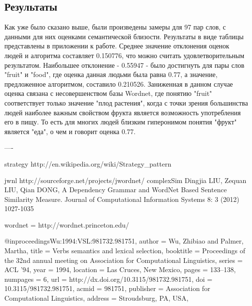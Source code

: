 \subsection{Результаты}
Как уже было сказано выше, были произведены замеры для 97 пар слов,
с данными для них оценками семантической близости. Результаты в виде таблицы
представлены в приложении к работе.
Среднее значение отклонения оценок людей и алгоритма составляет 0.150776,
что можно считать удовлетворительным результатом.
Наибольшее отклонение - 0.55947 - было достигнуть для пары слов
"fruit" и "food",
где оценка данная людьми была равна 0.77, а значение, предложенное алгоритмом,
составило 0.210526. Заниженная в данном случае оценка связана с несовершенством
базы Wordnet, где понятию "fruit" соответствует только значение "плод растения",
когда с точки зрения большинства людей наиболее важным свойством фрукта
является возможность употребления его в пищу. То есть для многих людей
близким гиперонимом понятия "фрукт" является "еда", о чем и говорит оценка 0.77.


----

strategy
http://en.wikipedia.org/wiki/Strategy_pattern

jwnl
http://sourceforge.net/projects/jwordnet/
complexSim
Dingjia LIU, Zequan LIU, Qian DONG, A Dependency Grammar and WordNet
Based Sentence Similarity Measure. Journal of Computational
Information Systems 8: 3 (2012) 1027-1035

wordnet = http://wordnet.princeton.edu/

@inproceedings{Wu:1994:VSL:981732.981751,
 author = {Wu, Zhibiao and Palmer, Martha},
 title = {Verbs semantics and lexical selection},
 booktitle = {Proceedings of the 32nd annual meeting on Association
for Computational Linguistics},
 series = {ACL '94},
 year = {1994},
 location = {Las Cruces, New Mexico},
 pages = {133--138},
 numpages = {6},
 url = {http://dx.doi.org/10.3115/981732.981751},
 doi = {10.3115/981732.981751},
 acmid = {981751},
 publisher = {Association for Computational Linguistics},
 address = {Stroudsburg, PA, USA},
}
